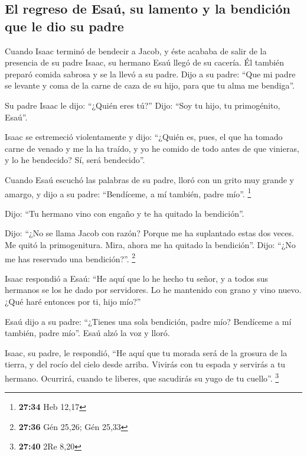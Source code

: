 \hypertarget{el-regreso-de-esauxfa-su-lamento-y-la-bendiciuxf3n-que-le-dio-su-padre}{%
\subsection{El regreso de Esaú, su lamento y la bendición que le dio su
padre}\label{el-regreso-de-esauxfa-su-lamento-y-la-bendiciuxf3n-que-le-dio-su-padre}}

 Cuando Isaac terminó de bendecir a Jacob, y éste acababa
de salir de la presencia de su padre Isaac, su hermano Esaú llegó de su
cacería.  Él también preparó comida sabrosa y se la llevó
a su padre. Dijo a su padre: ``Que mi padre se levante y coma de la
carne de caza de su hijo, para que tu alma me bendiga''.

 Su padre Isaac le dijo: ``¿Quién eres tú?'' Dijo: ``Soy
tu hijo, tu primogénito, Esaú''.

 Isaac se estremeció violentamente y dijo: ``¿Quién es,
pues, el que ha tomado carne de venado y me la ha traído, y yo he comido
de todo antes de que vinieras, y lo he bendecido? Sí, será bendecido''.

 Cuando Esaú escuchó las palabras de su padre, lloró con
un grito muy grande y amargo, y dijo a su padre: ``Bendíceme, a mí
también, padre mío''. \footnote{\textbf{27:34} Heb 12,17}

 Dijo: ``Tu hermano vino con engaño y te ha quitado la
bendición''.

 Dijo: ``¿No se llama Jacob con razón? Porque me ha
suplantado estas dos veces. Me quitó la primogenitura. Mira, ahora me ha
quitado la bendición''. Dijo: ``¿No me has reservado una bendición?''.
\footnote{\textbf{27:36} Gén 25,26; Gén 25,33}

 Isaac respondió a Esaú: ``He aquí que lo he hecho tu
señor, y a todos sus hermanos se los he dado por servidores. Lo he
mantenido con grano y vino nuevo. ¿Qué haré entonces por ti, hijo mío?''

 Esaú dijo a su padre: ``¿Tienes una sola bendición,
padre mío? Bendíceme a mí también, padre mío''. Esaú alzó la voz y
lloró.

 Isaac, su padre, le respondió, ``He aquí que tu morada
será de la grosura de la tierra, y del rocío del cielo desde arriba.
 Vivirás con tu espada y servirás a tu hermano. Ocurrirá,
cuando te liberes, que sacudirás su yugo de tu cuello''. \footnote{\textbf{27:40}
  2Re 8,20}

